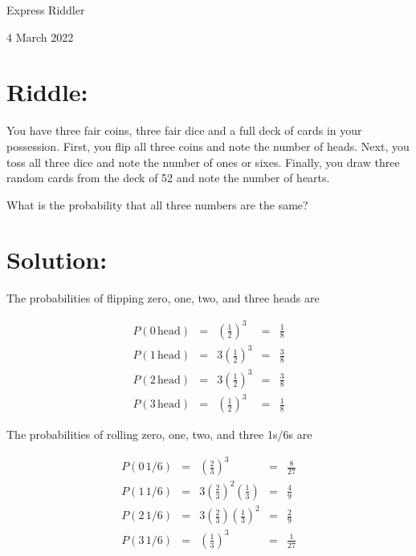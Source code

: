 \documentclass{article}
\begin{document}
\pagestyle{empty} %

\begin{center}
{\LARGE Express Riddler}

\vspace{0.15in}

{\Large 4 March 2022}
\end{center}


\section*{Riddle:}

You have three fair coins, three fair dice and a full deck of cards in your possession.
First, you flip all three coins and note the number of heads.
Next, you toss all three dice and note the number of ones or sixes.
Finally, you draw three random cards from the deck of 52 and note the number of hearts.

What is the probability that all three numbers are the same?


\section*{Solution:}

The probabilities of flipping zero, one, two, and three heads are

\[
\begin{matrix}
P(0\,\mathrm{head}) &=& \left(\frac{1}{2}\right)^{3} &=& \frac{1}{8} \\
P(1\,\mathrm{head}) &=& 3\left(\frac{1}{2}\right)^{3} &=& \frac{3}{8} \\
P(2\,\mathrm{head}) &=& 3\left(\frac{1}{2}\right)^{3} &=& \frac{3}{8} \\
P(3\,\mathrm{head}) &=& \left(\frac{1}{2}\right)^{3} &=& \frac{1}{8}
\end{matrix}
\]

The probabilities of rolling zero, one, two, and three 1s/6s are

\[
\begin{matrix}
P(0\,1/6) &=& \left(\frac{2}{3}\right)^{3} &=& \frac{8}{27} \\
P(1\,1/6) &=& 3\left(\frac{2}{3}\right)^{2}\left(\frac{1}{3}\right) &=& \frac{4}{9} \\
P(2\,1/6) &=& 3\left(\frac{2}{3}\right)\left(\frac{1}{3}\right)^{2} &=& \frac{2}{9} \\
P(3\,1/6) &=& \left(\frac{1}{3}\right)^{3} &=& \frac{1}{27}
\end{matrix}
\]
\end{document}
